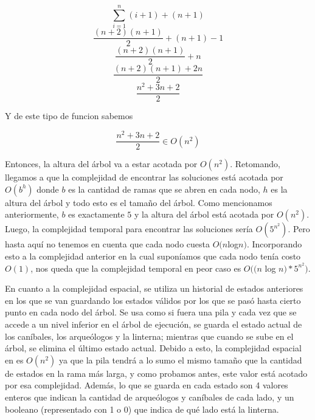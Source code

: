       \[
      \sum_{i=1}^{n}(i+1) + (n+1)
      \]
      \[
      \frac{(n+2)(n+1)}{2} + (n+1) - 1
      \]
      \[
      \frac{(n+2)(n+1)}{2} + n
      \]
      \[
      \frac{(n+2)(n+1)+2n}{2}
      \]
      \[
      \frac{n^2+3n+2}{2}
      \]

      Y de este tipo de funcion sabemos \newline

      \[
      \frac{n^2+3n+2}{2} \in O(n^2)
      \]

      Entonces, la altura del árbol va a estar acotada por $O(n^2)$.
      Retomando, llegamos a que la complejidad de encontrar las soluciones está acotada por $O(b^h)$ donde $b$ es la cantidad de ramas que se abren en cada nodo, $h$ es la altura del árbol y todo esto es el tamaño del árbol. Como mencionamos anteriormente, $b$ es exactamente $5$ y la altura del árbol está acotada por $O(n^2)$. Luego, la complejidad temporal para encontrar las soluciones sería $O(5^{n^2})$. Pero hasta aquí no tenemos en cuenta que cada nodo cuesta $O(n $log$ n)$. Incorporando esto a la complejidad anterior en la cual suponíamos que cada nodo tenía costo $O(1)$, nos queda que la complejidad temporal en peor caso es $O((n$ log $n) * 5^{n^2})$.

      En cuanto a la complejidad espacial, se utiliza un historial de estados anteriores en los que se van guardando los estados válidos por los que se pasó hasta cierto punto en cada nodo del árbol. Se usa como si fuera una pila y cada vez que se accede a un nivel inferior en el árbol de ejecución, se guarda el estado actual de los caníbales, los arqueólogos y la linterna; mientras que cuando se sube en el árbol, se elimina el último estado actual. Debido a esto, la complejidad espacial en es $O(n^2)$ ya que la pila tendrá a lo sumo el mismo tamaño que la cantidad de estados en la rama más larga, y como probamos antes, este valor está acotado por esa complejidad. Además, lo que se guarda en cada estado son 4 valores enteros que indican la cantidad de arqueólogos y caníbales de cada lado, y un booleano (representado con 1 o 0) que indica de qué lado está la linterna.



